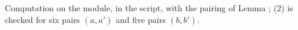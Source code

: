 Computation on the module, in the script, with the pairing of Lemma ; (2) is checked for six pairs $(a, a')$ and five pairs $(b, b')$.
